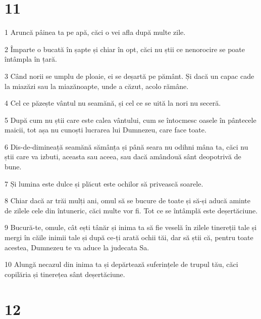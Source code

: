\chapter{11}

\par 1 Aruncă pâinea ta pe apă, căci o vei afla după multe zile.
\par 2 Împarte o bucată în șapte și chiar în opt, căci nu știi ce nenorocire se poate întâmpla în țară.
\par 3 Când norii se umplu de ploaie, ei se deșartă pe pământ. Și dacă un capac cade la miazăzi sau la miazănoapte, unde a căzut, acolo rămâne.
\par 4 Cel ce păzește vântul nu seamănă, și cel ce se uită la nori nu seceră.
\par 5 După cum nu știi care este calea vântului, cum se întocmesc oasele în pântecele maicii, tot așa nu cunoști lucrarea lui Dumnezeu, care face toate.
\par 6 Dis-de-dimineață seamănă sămânța și până seara nu odihni mâna ta, căci nu știi care va izbuti, aceasta sau aceea, sau dacă amândouă sânt deopotrivă de bune.
\par 7 Și lumina este dulce și plăcut este ochilor să privească soarele.
\par 8 Chiar dacă ar trăi mulți ani, omul să se bucure de toate și să-și aducă aminte de zilele cele din întuneric, căci multe vor fi. Tot ce se întâmplă este deșertăciune.
\par 9 Bucură-te, omule, cât ești tânăr și inima ta să fie veselă în zilele tinereții tale și mergi în căile inimii tale și după ce-ți arată ochii tăi, dar să știi că, pentru toate acestea, Dumnezeu te va aduce la judecata Sa.
\par 10 Alungă necazul din inima ta și depărtează suferințele de trupul tău, căci copilăria și tinerețea sânt deșertăciune.

\chapter{12}

